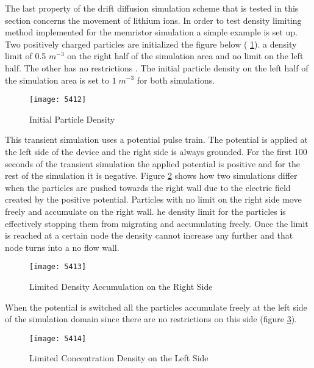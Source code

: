 \begin{doublespace}
The last property of the drift diffusion simulation scheme that is tested in this section concerns the movement of lithium ions. In order to test  density limiting method implemented for the memristor simulation a simple example is set up. Two  positively charged particles are initialized  the figure below ( \ref{5412}).  a density limit of 0.5 $m^{-3}$  on the right half of the simulation area and no limit on the left half. The other  has no restrictions . The initial particle density on the left half of the simulation area is set to $1 \; m^{-3}$ for both simulations.
\begin{figure}[!htp]
\centering
\texttt{[image: 5412]}
\caption{Initial Particle Density} 
\label{5412}
\end{figure}

This transient simulation uses a potential pulse train. The potential is applied at the left side of the device and the right side is always grounded. For the first 100 seconds of the transient simulation the applied potential is positive and for the rest of the simulation it is negative. Figure \ref{5413} shows how two simulations differ when the particles are pushed towards the right wall due to the electric field created by the positive potential. Particles with no limit on the right side move freely and accumulate on the right wall. he density limit  for the  particles is effectively stopping them from migrating and accumulating freely. Once the limit is reached at a certain node the density cannot increase any further and that node turns into a no flow wall. 

\begin{figure}[!htp]
\centering
\texttt{[image: 5413]}
\caption{Limited Density Accumulation on the Right Side} 
\label{5413}
\end{figure}

When the potential is switched all the particles accumulate freely at the left side of the simulation domain since there are no restrictions on this side (figure \ref{5414}).

\begin{figure}[!htp]
\centering
\texttt{[image: 5414]}
\caption{Limited Concentration Density on the Left Side} 
\label{5414}
\end{figure}


\end{doublespace}

